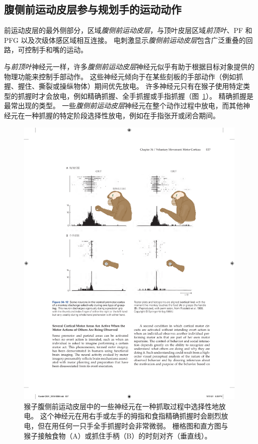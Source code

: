 \subsection{腹侧前运动皮层参与规划手的运动动作}

前运动皮层的最外侧部分，区域\textit{腹侧前运动皮层}，与顶叶皮层区域\textit{前顶叶}、PF 和 PFG 以及次级体感区域相互连接。
电刺激显示\textit{腹侧前运动皮层}包含广泛重叠的回路，可控制手和嘴的运动。


与\textit{前顶叶}神经元一样，许多\textit{腹侧前运动皮层}神经元似乎有助于根据目标对象提供的物理功能来控制手部动作。
这些神经元倾向于在某些刻板的手部动作（例如抓握、握住、撕裂或操纵物体）期间优先放电。
许多神经元只有在猴子使用特定类型的抓握时才会放电，例如精确抓握、全手抓握或手指抓握（图~\ref{fig:34_12}）。
精确抓握是最常出现的类型。
一些\textit{腹侧前运动皮层}神经元在整个动作过程中放电，而其他神经元在一种抓握的特定阶段选择性放电，例如在手指张开或闭合期间。


\begin{figure}[htbp]
	\centering
	\includegraphics[width=0.97\linewidth]{chap34/fig_34_12}
	\caption{猴子腹侧前运动皮层中的一些神经元在一种抓取过程中选择性地放电。
		这个神经元在用右手或左手的拇指和食指精确抓握时会剧烈放电，但在用任何一只手全手抓握时会非常微弱。
		栅格图和直方图与猴子接触食物（A）或抓住手柄（B）的时刻对齐（垂直线）。}
	\label{fig:34_12}
\end{figure}


